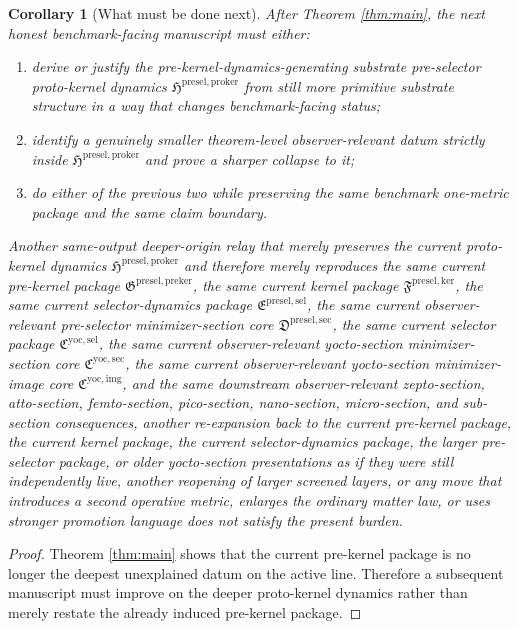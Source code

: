 \documentclass[11pt]{article}
\newcommand{\YoctoImageCore}{\mathfrak C^{\mathrm{yoc,img}}}
\newcommand{\YoctoMinSectionCore}{\mathfrak C^{\mathrm{yoc,sec}}}
\newcommand{\YoctoSelectorPackage}{\mathfrak C^{\mathrm{yoc,sel}}}
\newcommand{\PreSelectorMinSectionCore}{\mathfrak D^{\mathrm{presel,sec}}}
\newcommand{\PreSectionSelectorPackage}{\mathfrak E^{\mathrm{presel,sel}}}
\newcommand{\KernelPackage}{\mathfrak F^{\mathrm{presel,ker}}}
\newcommand{\PreKernelPackage}{\mathfrak G^{\mathrm{presel,preker}}}
\newcommand{\ProtoKernelPackage}{\mathfrak H^{\mathrm{presel,proker}}}
\newtheorem{corollary}{Corollary}
\begin{document}
\begin{corollary}[What must be done next]
\label{cor:next}
After Theorem \ref{thm:main}, the next honest benchmark-facing manuscript must either:
\begin{enumerate}
    \item derive or justify the pre-kernel-dynamics-generating substrate pre-selector proto-kernel dynamics \(\ProtoKernelPackage\) from still more primitive substrate structure in a way that changes benchmark-facing status;
    \item identify a genuinely smaller theorem-level observer-relevant datum strictly inside \(\ProtoKernelPackage\) and prove a sharper collapse to it;
    \item do either of the previous two while preserving the same benchmark one-metric package and the same claim boundary.
\end{enumerate}
Another same-output deeper-origin relay that merely preserves the current proto-kernel dynamics \(\ProtoKernelPackage\) and therefore merely reproduces the same current pre-kernel package \(\PreKernelPackage\), the same current kernel package \(\KernelPackage\), the same current selector-dynamics package \(\PreSectionSelectorPackage\), the same current observer-relevant pre-selector minimizer-section core \(\PreSelectorMinSectionCore\), the same current selector package \(\YoctoSelectorPackage\), the same current observer-relevant yocto-section minimizer-section core \(\YoctoMinSectionCore\), the same current observer-relevant yocto-section minimizer-image core \(\YoctoImageCore\), and the same downstream observer-relevant zepto-section, atto-section, femto-section, pico-section, nano-section, micro-section, and sub-section consequences, another re-expansion back to the current pre-kernel package, the current kernel package, the current selector-dynamics package, the larger pre-selector package, or older yocto-section presentations as if they were still independently live, another reopening of larger screened layers, or any move that introduces a second operative metric, enlarges the ordinary matter law, or uses stronger promotion language does not satisfy the present burden.
\end{corollary}

\begin{proof}
Theorem \ref{thm:main} shows that the current pre-kernel package is no longer the deepest unexplained datum on the active line. Therefore a subsequent manuscript must improve on the deeper proto-kernel dynamics rather than merely restate the already induced pre-kernel package.
\end{proof}
\end{document}
